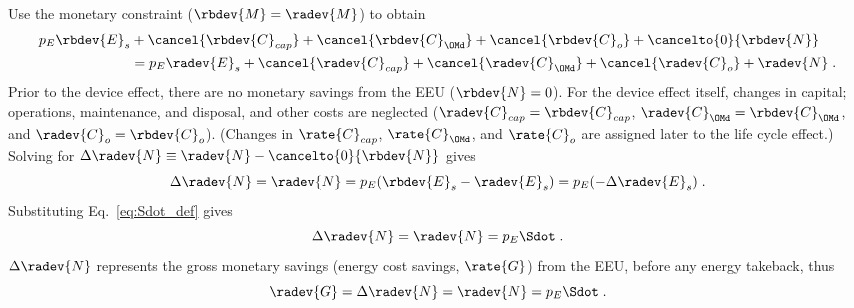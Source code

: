 \begin{landscape}
{Use the monetary constraint ($\rbdev{M} = \radev{M}$) to obtain
%
\begin{align}
  p_E \rbdev{E}_s &+ \cancel{\rbdev{C}_{cap}} + \cancel{\rbdev{C}_{\OMd}} + \cancel{\rbdev{C}_o} + \cancelto{0}{\rbdev{N}} \nonumber \\
                  &= p_E \radev{E}_s + \cancel{\radev{C}_{cap}} + \cancel{\radev{C}_{\OMd}} + \cancel{\radev{C}_o}  + \radev{N} \; .
\end{align}
%
Prior to the device effect, there are no monetary savings from the EEU ($\rbdev{N} = 0$).
For the device effect itself, 
changes in capital; operations, maintenance, and disposal, and other costs are neglected
($\radev{C}_{cap} = \rbdev{C}_{cap}$, $\radev{C}_{\OMd} = \rbdev{C}_{\OMd}$, and $\radev{C}_o = \rbdev{C}_o$).
(Changes in $\rate{C}_{cap}$, $\rate{C}_{\OMd}$, and $\rate{C}_o$ 
are assigned later to the life cycle effect.)
Solving for $\Delta \radev{N} \equiv \radev{N} - \cancelto{0}{\rbdev{N}}$ gives 
%
\begin{equation}
  \Delta \radev{N} = \radev{N} = p_E(\rbdev{E}_s - \radev{E}_s) = p_E (-\Delta \radev{E}_s) \; .
\end{equation}
%
Substituting Eq.~\ref{eq:Sdot_def} gives
%
\begin{equation}
  \Delta \radev{N} = \radev{N} = p_E \Sdot \; .
\end{equation}
%
$\Delta \radev{N}$ represents the gross monetary savings (energy cost savings, $\rate{G}$) from the EEU, 
before any energy takeback, thus
%
\begin{equation}
  \radev{G} = \Delta \radev{N} = \radev{N} = p_E \Sdot \; .
\end{equation}
}

\end{landscape}
